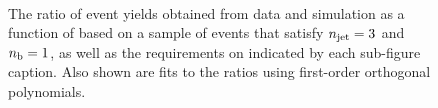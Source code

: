 \begin{figure}[h!]
\begin{center}
    \\
    \caption{The ratio of event yields obtained from data and simulation as a function of \mht [GeV] based on a sample of \mj events that satisfy $n_{\text{jet}} = 3$ and $n_{\text{b}} = 1$, as well as the requirements on \scalht indicated by each sub-figure caption. Also shown are fits to the ratios using first-order orthogonal polynomials.}
    \label{fig:mhtval_Mu_eq3j_eq1b}
  \end{center}
\end{figure}

